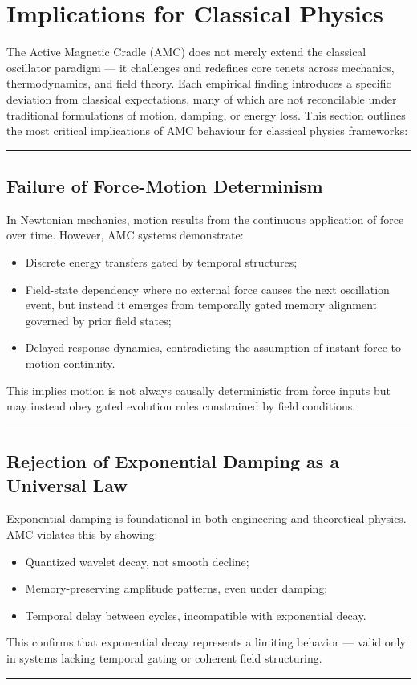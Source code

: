 \documentclass[10pt,aps,pre,onecolumn,superscriptaddress,notitlepage]{revtex4-2}
\begin{document}
\section{Implications for Classical Physics}
\label{sec:implic}
The Active Magnetic Cradle (AMC) does not merely extend the classical oscillator paradigm — it challenges and redefines core tenets across mechanics, thermodynamics, and field theory. Each empirical finding introduces a specific deviation from classical expectations, many of which are not reconcilable under traditional formulations of motion, damping, or energy loss.
This section outlines the most critical implications of AMC behaviour for classical physics frameworks: 
\vspace{1em}
\hrule
\vspace{1em}
\subsection{Failure of Force-Motion Determinism}
In Newtonian mechanics, motion results from the continuous application of force over time. However, AMC systems demonstrate:
\begin{itemize}
    \item Discrete energy transfers gated by temporal structures;
    \item Field-state dependency where no external force causes the next oscillation event, but instead it emerges from temporally gated memory alignment governed by prior field states;
    \item Delayed response dynamics, contradicting the assumption of instant force-to-motion continuity.

\end{itemize}
This implies motion is not always causally deterministic from force inputs but may instead obey gated evolution rules constrained by field conditions. 
\vspace{1em}
\hrule
\vspace{1em}
\subsection{Rejection of Exponential Damping as a Universal Law}
Exponential damping is foundational in both engineering and theoretical physics. AMC violates this by showing:
\begin{itemize}
    \item Quantized wavelet decay, not smooth decline;
    \item Memory-preserving amplitude patterns, even under damping;
    \item Temporal delay between cycles, incompatible with exponential decay.
\end{itemize}
This confirms that exponential decay represents a limiting behavior — valid only in systems lacking temporal gating or coherent field structuring. 
\vspace{1em}
\hrule
\vspace{1em}
\end{document}
